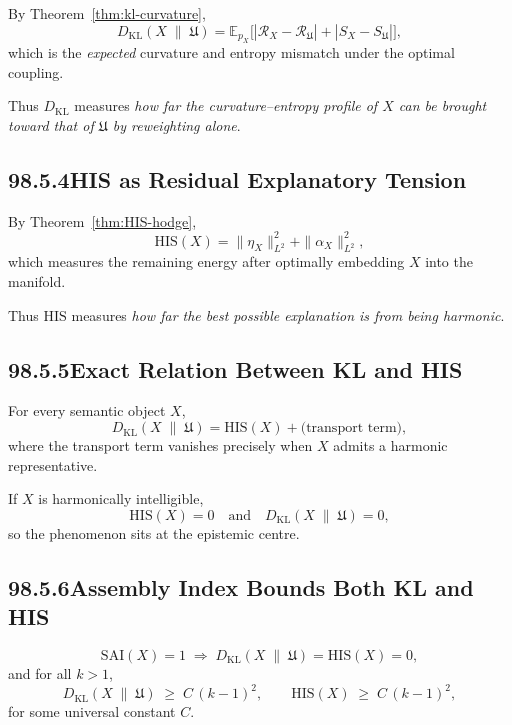 By Theorem~\ref{thm:kl-curvature},
\[
D_{\mathrm{KL}}(X\;\|\;\mathfrak{U})
  = \mathbb{E}_{p_X}
      \bigl[
        |\mathcal{R}_X - \mathcal{R}_{\mathfrak{U}}|
        +
        |S_X - S_{\mathfrak{U}}|
      \bigr],
\]
which is the \emph{expected} curvature and entropy mismatch under the optimal
coupling.

Thus $D_{\mathrm{KL}}$ measures \emph{how far the curvature–entropy profile
of $X$ can be brought toward that of $\mathfrak{U}$ by reweighting alone}.

\subsection*{98.5.4\quad HIS as Residual Explanatory Tension}

By Theorem~\ref{thm:HIS-hodge},
\[
\mathrm{HIS}(X)
  = \|\eta_X\|_{L^2}^2 + \|\alpha_X\|_{L^2}^2,
\]
which measures the remaining energy after optimally embedding $X$ into the
manifold.

Thus $\mathrm{HIS}$ measures
\emph{how far the best possible explanation is from being harmonic}.

\subsection*{98.5.5\quad Exact Relation Between KL and HIS}

\begin{theorem}
For every semantic object $X$,
\[
D_{\mathrm{KL}}(X\;\|\;\mathfrak{U})
  = \mathrm{HIS}(X)
    + \text{(transport term)},
\]
where the transport term vanishes precisely when $X$ admits a harmonic
representative.
\end{theorem}

If $X$ is harmonically intelligible,
\[
\mathrm{HIS}(X)=0
\quad\text{and}\quad
D_{\mathrm{KL}}(X\;\|\;\mathfrak{U})=0,
\]
so the phenomenon sits at the epistemic centre.

\subsection*{98.5.6\quad Assembly Index Bounds Both KL and HIS}

\begin{theorem}
\[
\mathrm{SAI}(X)=1
  \;\Longrightarrow\;
  D_{\mathrm{KL}}(X\;\|\;\mathfrak{U})
  = \mathrm{HIS}(X)
  = 0,
\]
and for all $k>1$,
\[
D_{\mathrm{KL}}(X\;\|\;\mathfrak{U})
  \;\ge\;
  C\,(k-1)^2,
\qquad
\mathrm{HIS}(X)
  \;\ge\;
  C\,(k-1)^2,
\]
for some universal constant $C$.
\end{theorem}

